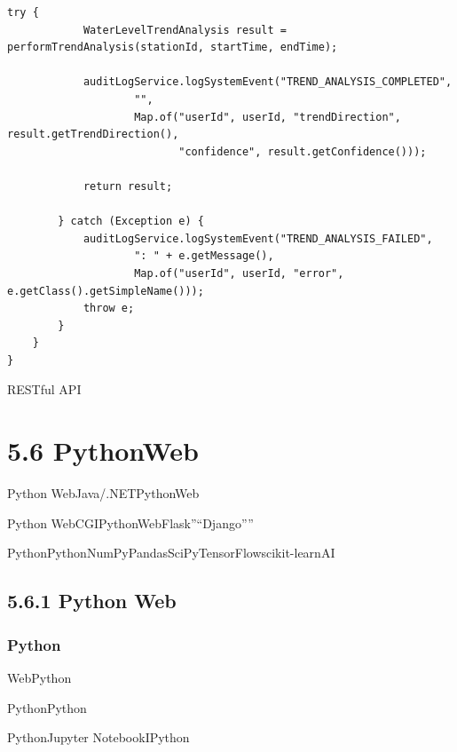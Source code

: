 \begin{lstlisting}[style=java]
        try {
            WaterLevelTrendAnalysis result = performTrendAnalysis(stationId, startTime, endTime);
            
            auditLogService.logSystemEvent("TREND_ANALYSIS_COMPLETED", 
                    "", 
                    Map.of("userId", userId, "trendDirection", result.getTrendDirection(),
                           "confidence", result.getConfidence()));
            
            return result;
            
        } catch (Exception e) {
            auditLogService.logSystemEvent("TREND_ANALYSIS_FAILED", 
                    ": " + e.getMessage(),
                    Map.of("userId", userId, "error", e.getClass().getSimpleName()));
            throw e;
        }
    }
}
\end{lstlisting}

RESTful API

\hypertarget{pythonweb}{%
\section{5.6 PythonWeb}\label{pythonweb}}

Python WebJava/.NETPythonWeb

Python
WebCGIPythonWeb\important{}\important{}Flask''``Django''''

Python\important{}PythonNumPyPandasSciPy\important{}TensorFlowscikit-learnAI\important{}\important{}

\hypertarget{python-web}{%
\subsection{5.6.1 Python Web}\label{python-web}}

\hypertarget{python}{%
\subsubsection{Python}\label{python}}

Web\important{}Python

\important{}PythonPython

\important{}PythonJupyter NotebookIPython

